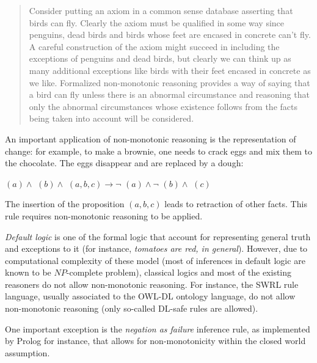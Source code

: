 \begin{quotation}
Consider putting an axiom in a common sense database asserting that birds can
fly. Clearly the axiom must be qualified in some way since penguins, dead birds
and birds whose feet are encased in concrete can't fly. A careful construction
of the axiom might succeed in including the exceptions of penguins and dead
birds, but clearly we can think up as many additional exceptions like birds
with their feet encased in concrete as we like. Formalized non-monotonic
reasoning provides a way of saying that a bird can fly unless there
is an abnormal circumstance and reasoning that only the abnormal circumstances
whose existence follows from the facts being taken into account will be
considered.
\end{quotation}

An important application of non-monotonic reasoning is the representation of
change: for example, to make a brownie, one needs to crack eggs and mix them to the chocolate.
The eggs disappear and are replaced by a dough:

$(a) \land $  $(b) \land $
$(a, b, c) \to \lnot $ $(a) \land \lnot $
$(b) \land $ $(c)$

The insertion of the proposition $(a, b, c)$ leads to
retraction of other facts. This rule requires non-monotonic reasoning to be
applied.

\emph{Default logic} is one of the formal logic that account for representing
general truth and exceptions to it (for instance, \emph{tomatoes are red, in
general}). However, due to computational complexity of these model (most of
inferences in default logic are known to be $NP$-complete problem), classical
logics and most of the existing reasoners do not allow non-monotonic reasoning.
For instance, the SWRL rule language, usually associated to the OWL-DL ontology
language, do not allow non-monotonic reasoning (only so-called DL-safe rules
are allowed).


One important exception is the \emph{negation as failure} inference rule, as
implemented by {\sc Prolog} for instance, that allows for non-monotonicity
within the closed world assumption.


